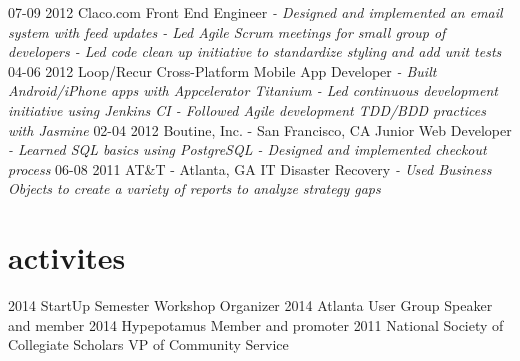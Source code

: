 \documentclass[]{cv}
\begin{document}
\begin{entrylist}
  \entry
    {07-09 2012}
    {Claco.com}
    {Front End Engineer}
    {\emph{- Designed and implemented an email system with feed updates
    \newline - Led Agile Scrum meetings for small group of developers
    \newline - Led code clean up initiative to standardize styling and add unit tests\newline}}
  \entry
    {04-06 2012}
    {Loop/Recur}
    {Cross-Platform Mobile App Developer}
    {\emph{- Built Android/iPhone apps with Appcelerator Titanium
    \newline - Led continuous development initiative using Jenkins CI
    \newline - Followed Agile development TDD/BDD practices with Jasmine\newline}}
  \entry
    {02-04 2012}
    {Boutine, Inc. - San Francisco, CA}
    {Junior Web Developer}
    {\emph{- Learned SQL basics using PostgreSQL
    \newline - Designed and implemented checkout process\newline}}
  \entry
    {06-08 2011}
    {AT\&T - Atlanta, GA}
    {IT Disaster Recovery}
    {\emph{- Used Business Objects to create a variety of reports to analyze strategy gaps\newline}}
\end{entrylist}

\section{activites}

\begin{entrylist}
  \entry
    {2014}
    {StartUp Semester}
    {Workshop Organizer}
    {}
  \entry
    {2014}
    {Atlanta User Group}
    {Speaker and member}
    {}
  \entry
    {2014}
    {Hypepotamus}
    {Member and promoter}
    {}
  \entry
    {2011}
    {National Society of Collegiate Scholars}
    {VP of Community Service}
    {}
\end{entrylist}
\end{document}
